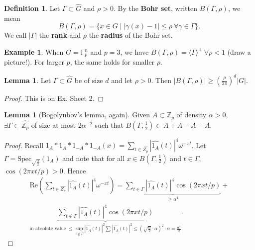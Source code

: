 \documentclass{article}
\theoremstyle{definition}
\newtheorem{lemma}[theorem]{Lemma}
\newtheorem{example}[theorem]{Example}
\newtheorem{defn}[theorem]{Definition}
\begin{document}
\begin{defn}
    Let $\Gamma \subset \widehat{G}$ and $\rho>0$. By the \textbf{Bohr set}, written $B(\Gamma,\rho)$, we mean \[
    B(\Gamma,\rho) = \{x \in G \mid \left|\gamma(x)-1 \right|\le \rho ~\forall \gamma \in \Gamma\}.
    \]
    We call $\left|\Gamma \right|$ the \textbf{rank} and $\rho$ the \textbf{radius} of the Bohr set.
\end{defn}
\begin{example}
    When $G = \mathbb{F}_p^n$ and $p = 3$, we have $B(\Gamma,\rho) = \langle \Gamma \rangle^\perp ~\forall \rho<1$ (draw a picture!). For larger $p$, the same holds for smaller $\rho$.
\end{example}
\begin{lemma}
    Let $\Gamma \subset \widehat{G}$ be of size $d$ and let $\rho > 0$. Then $\left|B(\Gamma,\rho) \right| \ge \left(\frac{\rho}{2\pi}\right)^d\left|G \right|$.
\end{lemma}
\begin{proof}
    This is on Ex. Sheet 2.
\end{proof}
\begin{lemma}[Bogolyubov's lemma, again]
    Given $A \subset \mathbb{Z}_p$ of density $\alpha > 0$, $\exists \Gamma \subset \widehat{\mathbb{Z}_p}$ of size at most $2\alpha^{-2}$ such that $B\left(\Gamma,\frac{1}{2}\right) \subset A + A - A - A$.
\end{lemma}
\begin{proof}
    Recall $1_A * 1_A * 1_{-A} * 1_{-A}(x) = \sum_{t \in \widehat{Z_p}}^{} \left|\widehat{1_A}(t) \right|^4 \omega^{-xt}$. Let $\Gamma = \text{Spec}_{\sqrt{\frac{\alpha}{2}}}(1_A)$ and note that for all $x \in B\left(\Gamma,\frac{1}{2}\right)$ and $t \in \Gamma$, $\cos(2\pi xt/p)>0$. Hence 
    \begin{align*}
        \text{Re}\left(\sum_{t \in \widehat{Z_p}}^{} \left|\widehat{1_A}(t) \right|^4\omega^{-xt}\right) = \underbrace{\sum_{t \in \Gamma}^{} \left|\widehat{1_A}(t) \right|^4 \cos \left(2\pi xt/p\right)}_{\ge \alpha^4} + \\
        \underbrace{\sum_{t \not\in \Gamma}^{} \left|\widehat{1_A}(t) \right|^4 \cos(2\pi xt/p)}_{\text{in absolute value }\le \sup_{t \not\in \Gamma}\left|\widehat{1_A}(t) \right|^2\sum_{}^{} \left|\widehat{1_A}(t) \right|^2 \le \left(\sqrt{\frac{\alpha}{2}}\cdot \alpha\right)^2\cdot \alpha =\frac{\alpha^4}{2}}.
    \end{align*}
\end{proof}
\end{document}
